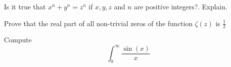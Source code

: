 \documentclass{exam}
\begin{document}
\begin{center}
\end{center}

\vspace{5mm}

\vspace{5mm}

\begin{questions}
\question Is it true that \(x^n + y^n = z^n\) if \(x,y,z\) and \(n\) are
positive integers?. Explain.

\question Prove that the real part of all non-trivial zeros of the function
\(\zeta(z)\) is \(\frac{1}{2}\)

\question Compute \[\int_{0}^{\infty} \frac{\sin(x)}{x}\]
\end{questions}
\end{document}
